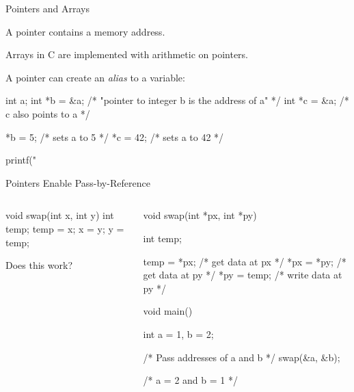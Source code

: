 \documentclass{plt}
\begin{document}
\begin{frame}[fragile]{Pointers and Arrays}

A pointer contains a memory address.

Arrays in C are implemented with arithmetic on pointers.

A pointer can create an \emph{alias} to a variable:

\begin{C}
int a;
int *b = &a;  /* "pointer to integer b is the address of a" */
int *c = &a;  /* c also points to a */

*b = 5;       /* sets a to 5 */
*c = 42;      /* sets a to 42 */

printf("%
\end{C}


\end{frame}

\begin{frame}[fragile]{Pointers Enable Pass-by-Reference}
\begin{columns}[t]
\begin{column}{0.4\textwidth}
\null

\begin{C}
void swap(int x, int y)
{
  int temp;
  temp = x;
  x = y;
  y = temp;
}
\end{C}

Does this work?

\end{column}
\pause
\begin{column}{0.6\textwidth}
\null

\begin{C}
void swap(int *px, int *py)
{
  int temp;

  temp = *px; /* get data at px */
  *px = *py;  /* get data at py */
  *py = temp; /* write data at py */
}

void main()
{
  int a = 1, b = 2;

  /* Pass addresses of a and b */
  swap(&a, &b);

  /* a = 2 and b = 1 */
}
\end{C}
\end{column}
\end{columns}

\end{frame}
\end{document}
